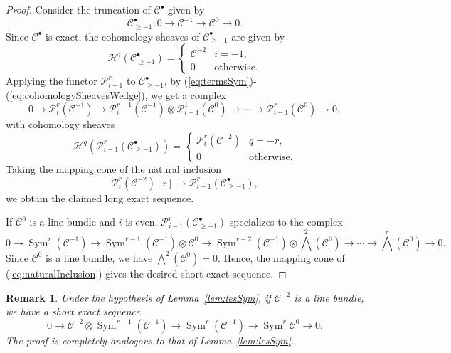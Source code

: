 \documentclass[11pt,letterpaper,reqno]{amsart}
\newcommand{\Sym}{\operatorname{Sym}}
\newcommand{\mc}[1]{\mathcal{#1}}
\def\lra{\longrightarrow}
\newtheorem{remark}[theorem]{Remark}
\theoremstyle{definition}
\numberwithin{equation}{section}
\begin{document}
\begin{proof}
    Consider the truncation of $\mc{C}^\bullet$ given by
    \[\mc{C}^\bullet_{\ge -1} \colon 0 \lra \mc{C}^{-1} \lra \mc{C}^0 \lra 0.\]
    Since $\mc{C}^\bullet$ is exact, the cohomology sheaves of $\mc{C}^\bullet_{\ge -1}$ are given by
    \[\mc{H}^{i}(\mc{C}^\bullet_{\ge -1}) = \begin{cases}
        \mc{C}^{-2} & i = -1,\\
        0 &\text{otherwise.}
    \end{cases}\]
    Applying the functor $\mc{P}_{i-1}^r$ to $\mc{C}^\bullet_{\ge -1}$, by (\ref{eq:termsSym})-(\ref{eq:cohomologySheavesWedge}), we get a complex
    \[0 \lra \mc{P}_i^r(\mc{C}^{-1}) \lra \mc{P}^{r-1}_i (\mc{C}^{-1})\otimes \mc{P}^1_{i-1}(\mc{C}^0) \lra \cdots \lra \mc{P}^r_{i-1}(\mc{C}^0) \lra 0,\]
    with cohomology sheaves
    \[\mc{H}^q\left( \mc{P}_{i-1}^r(\mc{C}^\bullet_{\ge -1} )\right) = \begin{cases}
        \mc{P}^r_i(\mc{C}^{-2}) &q = -r,\\
        0 &\text{otherwise}.
    \end{cases}\]
    Taking the mapping cone of the natural inclusion
    \begin{equation}\label{eq:naturalInclusion}
        \mc{P}^r_i(\mc{C}^{-2})[r] \lra \mc{P}_{i-1}^r(\mc{C}^\bullet_{\ge -1}),
    \end{equation}
    we obtain the claimed long exact sequence.

    If $\mc{C}^0$ is a line bundle and $i$ is even, $\mc{P}_{i-1}^r(\mc{C}^\bullet_{\ge -1})$ specializes to the complex
    \[0 \lra \Sym^r(\mc{C}^{-1}) \lra \Sym^{r-1}(\mc{C}^{-1}) \otimes \mc{C}^0 \lra \Sym^{r-2}(\mc{C}^{-1}) \otimes \bigwedge^2(\mc{C}^0) \lra \cdots \lra \bigwedge^r(\mc{C}^0) \lra 0.\]
    Since $\mc{C}^0$ is a line bundle, we have $\bigwedge^2(\mc{C}^0) = 0$. Hence, the mapping cone of (\ref{eq:naturalInclusion}) gives the desired short exact sequence.
\end{proof}
\begin{remark}\label{rmk:C-2linebundle}
    Under the hypothesis of Lemma~\ref{lem:lesSym}, if $\mc{C}^{-2}$ is a line bundle, we have a short exact sequence
    \[0 \lra \mc{C}^{-2} \otimes \Sym^{r-1}(\mc{C}^{-1}) \lra \Sym^{r}(\mc{C}^{-1}) \lra \Sym^r{\mc{C}^0} \lra 0.\]
    The proof is completely analogous to that of Lemma~\ref{lem:lesSym}.
\end{remark}
\end{document}
